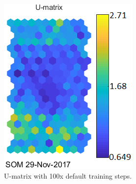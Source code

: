 \documentclass[a4paper,11pt,twocolumn]{article}
\begin{document}
\begin{figure}[htbp]
\begin{minipage}[t]{0.45\linewidth}
  \includegraphics[width=\linewidth]{figures/U-matrix2.png}
  \caption{U-matrix with 100x default training steps.}
  \label{fig:u2}
\end{minipage} 
\end{figure}
\end{document}
